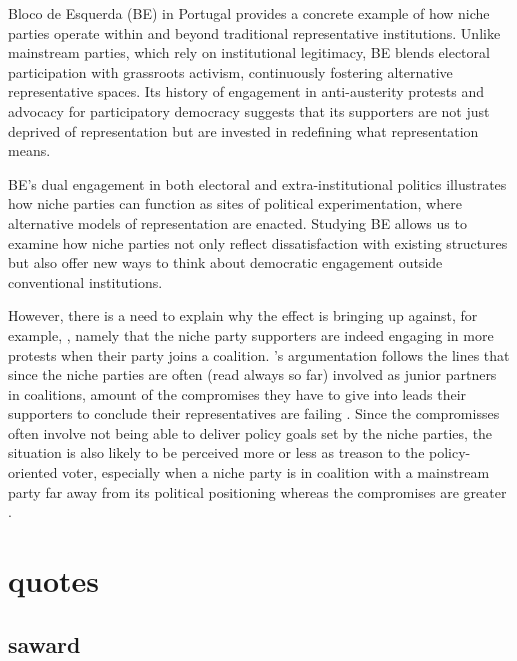 \begin{tcolorbox}
	Bloco de Esquerda (BE) in Portugal provides a concrete example of how niche parties operate within and beyond traditional representative institutions. Unlike mainstream parties, which rely on institutional legitimacy, BE blends electoral participation with grassroots activism, continuously fostering alternative representative spaces. Its history of engagement in anti-austerity protests and advocacy for participatory democracy suggests that its supporters are not just deprived of representation but are invested in redefining what representation means.

	BE’s dual engagement in both electoral and extra-institutional politics illustrates how niche parties can function as sites of political experimentation, where alternative models of representation are enacted. Studying BE allows us to examine how niche parties not only reflect dissatisfaction with existing structures but also offer new ways to think about democratic engagement outside conventional institutions.
\end{tcolorbox}

However, there is a need to explain why the effect
 is bringing up against, for example,
, namely that the niche party supporters are
indeed engaging in more protests when their party joins a coalition.
's argumentation follows the lines that since
the niche parties are often (read always so far) involved as junior partners in coalitions, amount
of the compromises they have to give into leads their supporters to conclude
their representatives are failing \parencite[see 31]{nonnemacher2023}. Since
the compromisses often involve not being able to deliver policy goals set by
the niche parties, the situation is also likely to be perceived more or less as
treason to the policy-oriented voter, especially when a niche party is in
coalition with a mainstream party far away from its political positioning
whereas the compromises are greater
\parencite[see
	32]{nonnemacher2023}.


\chapter{quotes}\label{chap:quotes} %

\section{saward}\label{sec:saward} %

